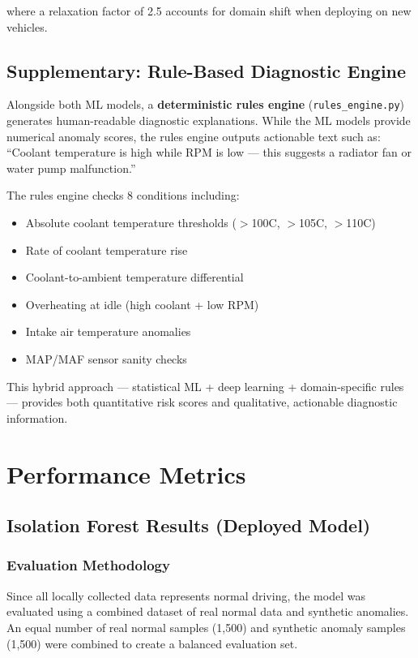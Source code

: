 where a relaxation factor of 2.5 accounts for domain shift when deploying on new vehicles.

\subsection{Supplementary: Rule-Based Diagnostic Engine}

Alongside both ML models, a \textbf{deterministic rules engine} (\texttt{rules\_engine.py}) generates human-readable diagnostic explanations. While the ML models provide numerical anomaly scores, the rules engine outputs actionable text such as: ``Coolant temperature is high while RPM is low --- this suggests a radiator fan or water pump malfunction.''

The rules engine checks 8 conditions including:
\begin{itemize}
    \item Absolute coolant temperature thresholds ($>$100\textdegree C, $>$105\textdegree C, $>$110\textdegree C)
    \item Rate of coolant temperature rise
    \item Coolant-to-ambient temperature differential
    \item Overheating at idle (high coolant + low RPM)
    \item Intake air temperature anomalies
    \item MAP/MAF sensor sanity checks
\end{itemize}

This hybrid approach --- statistical ML + deep learning + domain-specific rules --- provides both quantitative risk scores and qualitative, actionable diagnostic information.


\section{Performance Metrics}

\subsection{Isolation Forest Results (Deployed Model)}

\subsubsection{Evaluation Methodology}

Since all locally collected data represents normal driving, the model was evaluated using a combined dataset of real normal data and synthetic anomalies. An equal number of real normal samples (1,500) and synthetic anomaly samples (1,500) were combined to create a balanced evaluation set.

